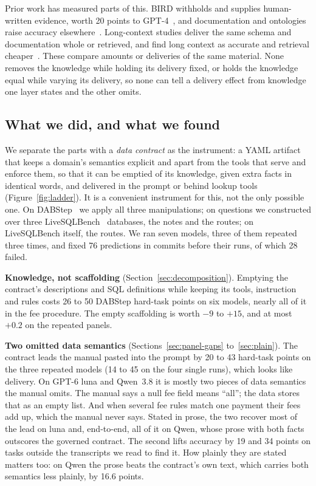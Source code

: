 Prior work has measured parts of this. BIRD withholds and supplies
human-written evidence, worth 20 points to GPT-4~\cite{bird}, and
documentation and ontologies raise accuracy
elsewhere~\cite{kaggledbqa,sequeda-kg}. Long-context studies deliver the
same schema and documentation whole or retrieved, and find long context as
accurate and retrieval cheaper~\cite{chung-long-context,death-schema-linking,rag-or-long-context}.
These compare amounts or deliveries of the same material. None removes the
knowledge while holding its delivery fixed, or holds the knowledge equal
while varying its delivery, so none can tell a delivery effect from
knowledge one layer states and the other omits.

\subsection*{What we did, and what we found}

We separate the parts with a \emph{data contract} as the instrument: a YAML
artifact that keeps a domain's semantics explicit and apart from the tools
that serve and enforce them, so that it can be emptied of its knowledge,
given extra facts in identical words, and delivered in the prompt or behind
lookup tools (Figure~\ref{fig:ladder}). It is a convenient instrument for
this, not the only possible one. On DABStep~\cite{dabstep} we apply all
three manipulations; on questions we constructed over three
LiveSQLBench~\cite{livesqlbench} databases, the notes and the routes; on
LiveSQLBench itself, the routes. We ran seven models, three of them
repeated three times, and fixed 76 predictions in commits before
their runs, of which 28 failed.

\textbf{Knowledge, not scaffolding} (Section~\ref{sec:decomposition}).
Emptying the contract's descriptions and SQL definitions while keeping its
tools, instruction and rules costs 26 to 50 DABStep hard-task points on
six models, nearly all of it in the fee procedure. The empty scaffolding is
worth $-9$ to $+15$, and at most $+0.2$ on the repeated panels.

\textbf{Two omitted data semantics} (Sections~\ref{sec:panel-gaps}
to~\ref{sec:plain}). The contract leads the manual pasted into the prompt
by 20 to 43 hard-task points on the three repeated models (14 to 45 on
the four single runs), which looks like delivery. On GPT-6 luna and
Qwen~3.8 it is mostly two pieces of data semantics the manual omits. The
manual says a null fee field means ``all''; the data stores that as an
empty list. And when several fee rules match one payment their fees add
up, which the manual never says. Stated in prose, the two recover most of
the lead on luna and, end-to-end, all of it on Qwen, whose prose with both
facts outscores the governed contract. The second lifts accuracy by 19 and
34 points on tasks outside the transcripts we read to find it. How plainly
they are stated matters too: on Qwen the prose beats the contract's own
text, which carries both semantics less plainly, by 16.6 points.

